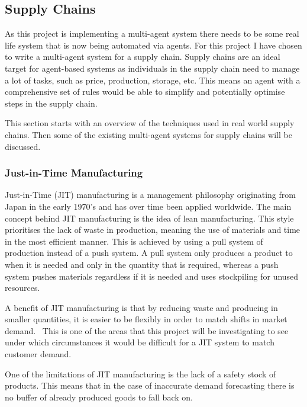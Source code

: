 \subsection{Supply Chains}

As this project is implementing a multi-agent system there needs to be some real life system that is now being automated via agents.
For this project I have chosen to write a multi-agent system for a supply chain.
Supply chains are an ideal target for agent-based systems as individuals in the supply chain need to manage a lot of tasks, such as price, production, storage, etc.
This means an agent with a comprehensive set of rules would be able to simplify and potentially optimise steps in the supply chain.

This section starts with an overview of the techniques used in real world supply chains.
Then some of the existing multi-agent systems for supply chains will be discussed.

\subsubsection{Just-in-Time Manufacturing}

Just-in-Time (JIT) manufacturing is a management philosophy originating from Japan in the early 1970's and has over time been applied worldwide.
The main concept behind JIT manufacturing is the idea of lean manufacturing.
This style prioritises the lack of waste in production, meaning the use of materials and time in the most efficient manner.
This is achieved by using a pull system of production instead of a push system.
A pull system only produces a product to when it is needed and only in the quantity that is required, whereas a push system pushes materials regardless if it is needed and uses stockpiling for unused resources.~\cite{javadian2013just}

A benefit of JIT manufacturing is that by reducing waste and producing in smaller quantities, it is easier to be flexibly in order to match shifts in market demand.~\cite{javadian2013just}
This is one of the areas that this project will be investigating to see under which circumstances it would be difficult for a JIT system to match customer demand.

One of the limitations of JIT manufacturing is the lack of a safety stock of products.
This means that in the case of inaccurate demand forecasting there is no buffer of already produced goods to fall back on.~\cite{javadian2013just}

